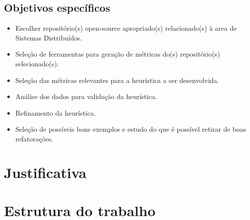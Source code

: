 \subsection{Objetivos específicos}\label{subsec:objetivosEspecificos}

\begin{itemize}
    \item Escolher repositório(s) open-source apropriado(s) relacionado(s) à area de Sistemas Distribuídos.
    \item Seleção de ferramentas para geração de métricas do(s) repositório(s) selecionado(s).
    \item Seleção das métricas relevantes para a heurística a ser desenvolvida.
    \item Análise dos dados para validação da heurística.
    \item Refinamento da heurística.
    \item Seleção de possíveis bons exemplos e estudo do que é possível retirar de boas refatoraçôes.
\end{itemize}

\section{Justificativa}\label{sec:justificativa}

\section{Estrutura do trabalho}\label{sec:estruturaTrabalho}

